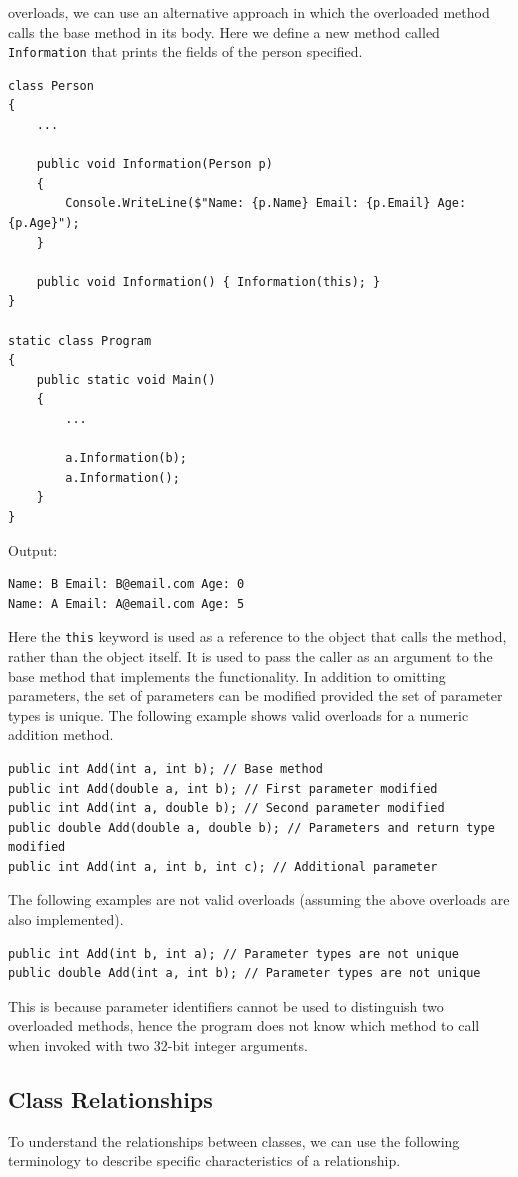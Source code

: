 \documentclass{article}
\begin{document}
overloads, we can use an alternative approach in which the overloaded
method calls the base method in its body. Here we define a new method
called \texttt{Information} that prints the fields of the
person specified.
\begin{verbatim}
class Person
{
    ...

    public void Information(Person p)
    {
        Console.WriteLine($"Name: {p.Name} Email: {p.Email} Age: {p.Age}");
    }

    public void Information() { Information(this); }
}

static class Program
{
    public static void Main()
    {
        ...

        a.Information(b);
        a.Information();
    }
}
\end{verbatim}
Output:
\begin{verbatim}
Name: B Email: B@email.com Age: 0
Name: A Email: A@email.com Age: 5
\end{verbatim}
Here the \texttt{this} keyword is used as a reference to
the object that calls the method, rather than the object itself. It is
used to pass the caller as an argument to the base method that
implements the functionality. In addition to omitting parameters, the
set of parameters can be modified provided the set of parameter types
is unique. The following example shows valid overloads for a numeric
addition method.
\begin{verbatim}
public int Add(int a, int b); // Base method
public int Add(double a, int b); // First parameter modified
public int Add(int a, double b); // Second parameter modified
public double Add(double a, double b); // Parameters and return type modified
public int Add(int a, int b, int c); // Additional parameter
\end{verbatim}
The following examples are not valid overloads (assuming the above
overloads are also implemented).
\begin{verbatim}
public int Add(int b, int a); // Parameter types are not unique
public double Add(int a, int b); // Parameter types are not unique
\end{verbatim}
This is because parameter identifiers cannot be used to distinguish two
overloaded methods, hence the program does not know which method to
call when invoked with two 32-bit integer arguments.
\subsection{Class Relationships}
To understand the relationships between classes, we can use the
following terminology to describe specific characteristics of a
relationship.
\end{document}
